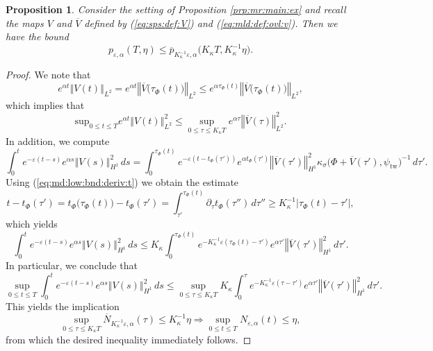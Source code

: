 \documentclass[10pt]{articleHJ}
\newcommand{\e}{\ensuremath{\varepsilon}}
\newcommand{\abs}[1]{\left\vert#1\right\vert}			%
\newcommand{\norm}[1]{\left\Vert#1\right\Vert}		%
\newcommand{\sref}[1]{(\ref{#1})}                       %
\newtheorem{prop}[thm]{Proposition}
\numberwithin{equation}{section}
\begin{document}
\begin{prop}
\label{prp:md:prob:after:time:transf}
Consider the setting of Proposition \ref{prp:mr:main:ex}
and recall the maps $V$ and $\overline{V}$
defined by \sref{eq:sps:def:V}
and
\sref{eq:mld:def:ovl:v}.
Then we have the bound
\begin{equation}
p_{\e,\alpha}(T,\eta)
\le \overline{p}_{ K_{\kappa}^{-1} \e, \alpha}
  \big( K_{\kappa} T , K_{\kappa}^{-1} \eta \big) .
\end{equation}
\end{prop}
\begin{proof}
We note that
\begin{equation}
e^{\alpha t}\norm{ V(t)}_{L^2}
= e^{\alpha t } \norm{
  \overline{V}\big( \tau_{\Phi}(t) \big) }_{L^2}
\le
  e^{\alpha \tau_{\Phi}(t) }
  \norm{  \overline{V}\big( \tau_{\Phi}(t) \big) }_{L^2} ,
\end{equation}
which implies that
\begin{equation}
\mathrm{sup}_{0 \le t \le  T}
 e^{\alpha t}\norm{ V(t)}_{L^2}^2
 \le \sup_{0 \le \tau \le K_{\kappa} T}
    e^{\alpha \tau} \norm{ \overline{V}(\tau)}_{L^2}^2 .
\end{equation}
In addition, we compute
\begin{equation}
\int_0^t e^{-\e(t -s)}
  e^{\alpha s}\norm{  V(s)}_{H^1}^2 \, ds
= \int_0^{\tau_\Phi(t)}
    e^{-\e(t - t_\Phi(\tau'))}
       e^{\alpha t_\Phi(\tau')} \norm{\overline{V}(\tau')}_{H^1}^2
      \kappa_{\sigma}\big(\Phi + \overline{V}(\tau'), \psi_{\mathrm{tw}} \big)^{-1}
       \, d \tau' .
\end{equation}
Using \sref{eq:md:low:bnd:deriv:t}
we obtain the estimate
\begin{equation}
t - t_\Phi(\tau') = t_\Phi\big(\tau_\Phi(t)\big) - t_\Phi(\tau')
= \int_{\tau'}^{\tau_\Phi(t)} \partial_\tau t_\Phi(\tau'') \, d \tau''
\ge K_{\kappa}^{-1} \abs{\tau_\Phi(t) - \tau'} ,
\end{equation}
which yields
\begin{equation}
\int_0^t e^{-\e(t -s)}
  e^{\alpha s}\norm{  V(s)}_{H^1}^2 \, ds
\le K_{\kappa} \int_0^{\tau_\Phi(t)}
    e^{-K_{\kappa}^{-1} \e(\tau_\Phi(t) - \tau') }
      e^{\alpha \tau'}\norm{\overline{V}(\tau')}_{H^1}^2
       \, d \tau'  .
\end{equation}
In particular, we conclude that
\begin{equation}
\sup_{0 \le t \le T} \int_0^t e^{-\e(t -s)}
  e^{\alpha s}\norm{ V(s)}_{H^1}^2 \, ds
\le
\sup_{0 \le \tau \le K_{\kappa} T }
 K_{\kappa} \int_0^{\tau}
    e^{-K_{\kappa}^{-1} \e(\tau - \tau') }
      e^{\alpha \tau'} \norm{\overline{V}(\tau')}_{H^1}^2
       \, d \tau' .
\end{equation}
This yields the implication
\begin{equation}
\sup_{0 \le \tau \le K_{\kappa} T }
 \overline{N}_{K_{\kappa}^{-1} \e , \alpha}(\tau) \le
   K_{\kappa}^{-1} \eta
\Rightarrow
\sup_{0 \le t \le  T }
  N_{\e,\alpha}(t) \le \eta ,
\end{equation}
from which the desired inequality immediately follows.
\end{proof}
\end{document}
